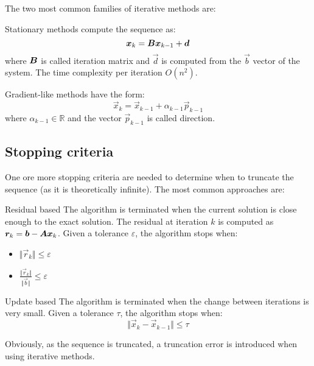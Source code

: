 The two most common families of iterative methods are:
\begin{descriptionlist}
    \item[Stationary methods] 
        compute the sequence as:
        \[ {\bm{x}}_k = {\bm{B}}{\bm{x}}_{k-1} + {\bm{d}} \]
        where ${\bm{B}}$ is called iteration matrix and $\vec{d}$ is computed from the $\vec{b}$ vector of the system.
        The time complexity per iteration $O(n^2)$.
    
    \item[Gradient-like methods] 
        have the form:
        \[ \vec{x}_k = \vec{x}_{k-1} + \alpha_{k-1}\vec{p}_{k-1} \]
        where $\alpha_{k-1} \in \mathbb{R}$ and the vector $\vec{p}_{k-1}$ is called direction.
\end{descriptionlist}

\subsection{Stopping criteria}
One ore more stopping criteria are needed to determine when to truncate the sequence (as it is theoretically infinite).
The most common approaches are:
\begin{descriptionlist}
    \item[Residual based]
        The algorithm is terminated when the current solution is close enough to the exact solution.
        The residual at iteration $k$ is computed as ${\bm{r}}_k = {\bm{b}} - {\bm{A}}{\bm{x}}_k$.
        Given a tolerance $\varepsilon$, the algorithm stops when:
        \begin{itemize}
            \item $\Vert \vec{r}_k \Vert \leq \varepsilon$
            \item $\frac{\Vert \vec{r}_k \Vert}{\Vert \vec{b} \Vert} \leq \varepsilon$
        \end{itemize}

    \item[Update based] 
        The algorithm is terminated when the change between iterations is very small.
        Given a tolerance $\tau$, the algorithm stops when:
        \[ \Vert \vec{x}_{k} - \vec{x}_{k-1} \Vert \leq \tau \]
\end{descriptionlist}
Obviously, as the sequence is truncated, a truncation error is introduced when using iterative methods.



